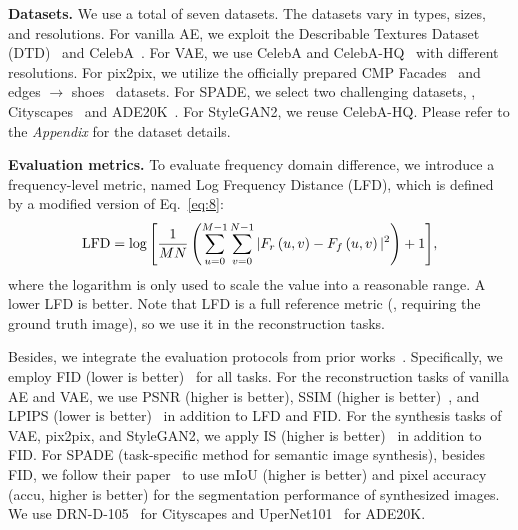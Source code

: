 \documentclass[10pt,twocolumn,letterpaper]{article}
\begin{document}
\vspace{0.05cm}
\noindent
\textbf{Datasets.}
We use a total of seven datasets.
The datasets vary in types, sizes, and resolutions.
For vanilla AE, we exploit the Describable Textures Dataset (DTD)~\cite{DTD} and CelebA~\cite{celeba}.
For VAE, we use CelebA and CelebA-HQ~\cite{pggan} with different resolutions.
For pix2pix, we utilize the officially prepared CMP Facades~\cite{cmpfacades} and edges $\rightarrow$ shoes~\cite{shoesutzappos50K} datasets.
For SPADE, we select two challenging datasets, \ie, Cityscapes~\cite{cityscapes} and ADE20K~\cite{ade20k}.
For StyleGAN2, we reuse CelebA-HQ.
Please refer to the \textit{Appendix} for the dataset details.








\vspace{0.05cm}
\noindent
\textbf{Evaluation metrics.}
To evaluate frequency domain difference, we introduce a frequency-level metric, named Log Frequency Distance (LFD), which is defined by a modified version of Eq.~\eqref{eq:8}:
\begin{equation}
\footnotesize
\label{eq:11}
    \mathrm{LFD}=\log{\left[\frac{1}{MN}\left(\sum_{u=0}^{M-1}\sum_{v=0}^{N-1}{|F_r\left(u,v\right)-F_f\left(u,v\right)|^2}\right)+1\right]},
\end{equation}
where the logarithm is only used to scale the value into a reasonable range.
A lower LFD is better. Note that LFD is a full reference metric (\ie, requiring the ground truth image), so we use it in the reconstruction tasks.

Besides, we integrate the evaluation protocols from prior works~\cite{nerf,BigGAN,SPADE,tsit}.
Specifically, we employ FID (lower is better)~\cite{TTUR} for all tasks.
For the reconstruction tasks of vanilla AE and VAE, we use PSNR (higher is better), SSIM (higher is better)~\cite{ssim}, and LPIPS (lower is better)~\cite{lpips} in addition to LFD and FID.
For the synthesis tasks of VAE, pix2pix, and StyleGAN2, we apply IS (higher is better)~\cite{is} in addition to FID.
For SPADE (task-specific method for semantic image synthesis), besides FID, we follow their paper~\cite{SPADE} to use mIoU (higher is better) and pixel accuracy (accu, higher is better) for the segmentation performance of synthesized images. We use DRN-D-105~\cite{drn} for Cityscapes and UperNet101~\cite{upernet} for ADE20K.
\end{document}
